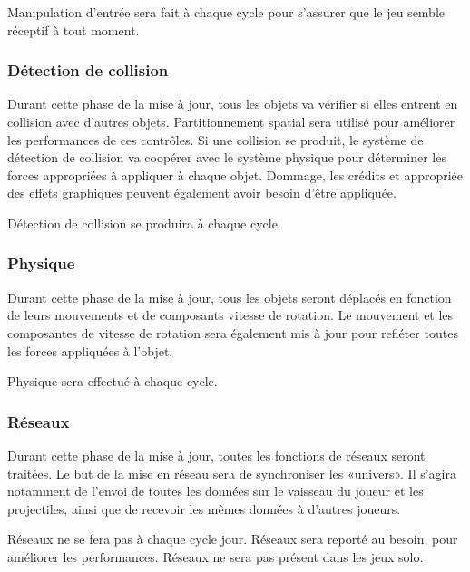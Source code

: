 Manipulation d'entrée sera fait à chaque cycle  pour s'assurer que le jeu semble réceptif à tout moment.


\subsubsection{Détection de collision} %
\label{ssub:détection_de_collision}

Durant cette phase de la mise à jour, tous les objets va vérifier si elles entrent en collision avec d'autres objets. Partitionnement spatial sera utilisé pour améliorer les performances de ces contrôles. Si une collision se produit, le système de détection de collision va coopérer avec le système physique pour déterminer les forces appropriées à appliquer à chaque objet. Dommage, les crédits et appropriée des effets graphiques peuvent également avoir besoin d'être appliquée. 

Détection de collision se produira à chaque cycle.


\subsubsection{Physique} %
\label{ssub:physique}

Durant cette phase de la mise à jour, tous les objets seront déplacés en fonction de leurs mouvements et de composants vitesse de rotation. Le mouvement et les composantes de vitesse de rotation sera également mis à jour pour refléter toutes les forces appliquées à l'objet. 

Physique sera effectué à chaque cycle.


\subsubsection{Réseaux} %
\label{ssub:réseau}

Durant cette phase de la mise à jour, toutes les fonctions de réseaux seront traitées. Le but de la mise en réseau sera de synchroniser les «univers». Il s'agira notamment de l'envoi de toutes les données sur le vaisseau du joueur et les projectiles, ainsi que de recevoir les mêmes données à d'autres joueurs. 

Réseaux ne se fera pas à chaque cycle jour. Réseaux sera reporté au besoin, pour améliorer les performances. Réseaux ne sera pas présent dans les jeux solo.

